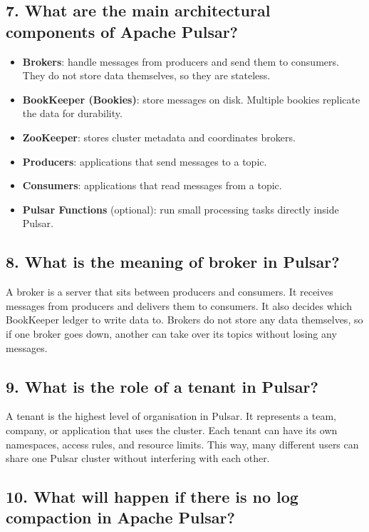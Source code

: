 \documentclass[11pt,a4paper]{article}
\begin{document}
\subsection*{7. What are the main architectural components of Apache Pulsar?}

\begin{itemize}[leftmargin=1.5cm]
  \item \textbf{Brokers}: handle messages from producers and send them to consumers.
        They do not store data themselves, so they are stateless.
  \item \textbf{BookKeeper (Bookies)}: store messages on disk. Multiple bookies replicate
        the data for durability.
  \item \textbf{ZooKeeper}: stores cluster metadata and coordinates brokers.
  \item \textbf{Producers}: applications that send messages to a topic.
  \item \textbf{Consumers}: applications that read messages from a topic.
  \item \textbf{Pulsar Functions} (optional): run small processing tasks directly inside Pulsar.
\end{itemize}

\subsection*{8. What is the meaning of broker in Pulsar?}

A broker is a server that sits between producers and consumers. It receives messages from
producers and delivers them to consumers. It also decides which BookKeeper ledger to write
data to. Brokers do not store any data themselves, so if one broker goes down, another can
take over its topics without losing any messages.

\subsection*{9. What is the role of a tenant in Pulsar?}

A tenant is the highest level of organisation in Pulsar. It represents a team, company, or
application that uses the cluster. Each tenant can have its own namespaces, access rules,
and resource limits. This way, many different users can share one Pulsar cluster without
interfering with each other.

\subsection*{10. What will happen if there is no log compaction in Apache Pulsar?}
\end{document}
